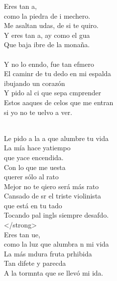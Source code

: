 \begin{cancion}%
	Eres tan a, \\
	como la piedra de i mechero.\\
	Me asaltan udas, de si te quiro.\\
	Y eres tan a, ay como el gua \\
	Que baja ibre de la monaña.\\
\jump\\
	Y no lo enndo, fue tan efmero \\
	El caminr de tu dedo en mi espalda \\
	ibujando un corazón\\
	Y pido al ci que sepa cmprender\\
	Estos aaques de celos que me entran\\
	si yo no te uelvo a ver.\\\jump\\
	\begin{chorus}%
	Le pido a la a que alumbre tu vida\\
	La mía hace yatiempo \\
que yace encendida.\\
	Con lo que me uesta \\
querer sólo al rato\\
	Mejor no te qiero será más rato\\
	Cansado de sr el triste violinista \\
	que está en tu tado\\
	Tocando pal ingls siempre desafdo. \\
 </strong>\\
	Eres tan ue, \\
	como la luz que alumbra n mi vida\\
	La más mdura fruta prhibida\\
	Tan difete y parecda\\
	A la tormnta que se llevó mi ida.\\
\jump\\

\end{chorus}
\end{cancion}
